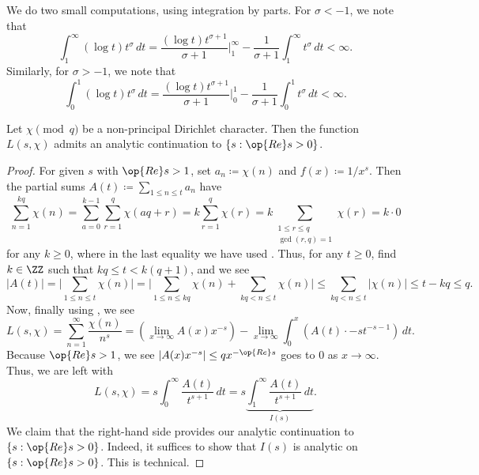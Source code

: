 \documentclass[../notes.tex]{subfiles}
\begin{document}
\begin{remark} \label{rem:annoying-log-power-ints}
	We do two small computations, using integration by parts. For $\sigma<-1$, we note that
	\[\int_1^\infty(\log t)t^\sigma\,dt=\frac{(\log t)t^{\sigma+1}}{\sigma+1}\bigg|_1^\infty-\frac1{\sigma+1}\int_1^\infty t^\sigma\,dt<\infty.\]
	Similarly, for $\sigma>-1$, we note that
	\[\int_0^1(\log t)t^\sigma\,dt=\frac{(\log t)t^{\sigma+1}}{\sigma+1}\bigg|_0^1-\frac1{\sigma+1}\int_0^1t^\sigma\,dt<\infty.\]
\end{remark}
\begin{proposition} \label{prop:continue-l-chi}
	Let $\chi\pmod q$ be a non-principal Dirichlet character. Then the function $L(s,\chi)$ admits an analytic continuation to $\{s:\op{Re}s>0\}$.
\end{proposition}
\begin{proof}
	For given $s$ with $\op{Re}s>1$, set $a_n\coloneqq\chi(n)$ and $f(x)\coloneqq1/x^s$. Then the partial sums $A(t)\coloneqq\sum_{1\le n\le t}a_n$ have
	\[\sum_{n=1}^{kq}\chi(n)=\sum_{a=0}^{k-1}\sum_{r=1}^q\chi(aq+r)=k\sum_{r=1}^q\chi(r)=k\sum_{\substack{1\le r\le q\\\gcd(r,q)=1}}\chi(r)=k\cdot0\]
	for any $k\ge0$, where in the last equality we have used . Thus, for any $t\ge0$, find $k\in\ZZ$ such that $kq\le t<k(q+1)$, and we see
	\[|A(t)|=\Bigg|\sum_{1\le n\le t}\chi(n)\Bigg|=\Bigg|\sum_{1\le n\le kq}\chi(n)+\sum_{kq<n\le t}\chi(n)\Bigg|\le\sum_{kq<n\le t}|\chi(n)|\le t-kq\le q.\]
	Now, finally using , we see
	\[L(s,\chi)=\sum_{n=1}^\infty\frac{\chi(n)}{n^s}=\left(\lim_{x\to\infty}A(x)x^{-s}\right)-\lim_{x\to\infty}\int_0^x\left(A(t)\cdot -st^{-s-1}\right)\,dt.\]
	Because $\op{Re}s>1$, we see $\left|A(x)x^{-s}\right|\le qx^{-\op{Re}s}$ goes to $0$ as $x\to\infty$. Thus, we are left with
	\[L(s,\chi)=s\int_0^\infty\frac{A(t)}{t^{s+1}}\,dt=s\underbrace{\int_1^\infty\frac{A(t)}{t^{s+1}}\,dt}_{I(s)}.\]
	We claim that the right-hand side provides our analytic continuation to $\{s:\op{Re}s>0\}$. Indeed, it suffices to show that $I(s)$ is analytic on $\{s:\op{Re}s>0\}$. This is technical.
	

\end{proof}
\end{document}
